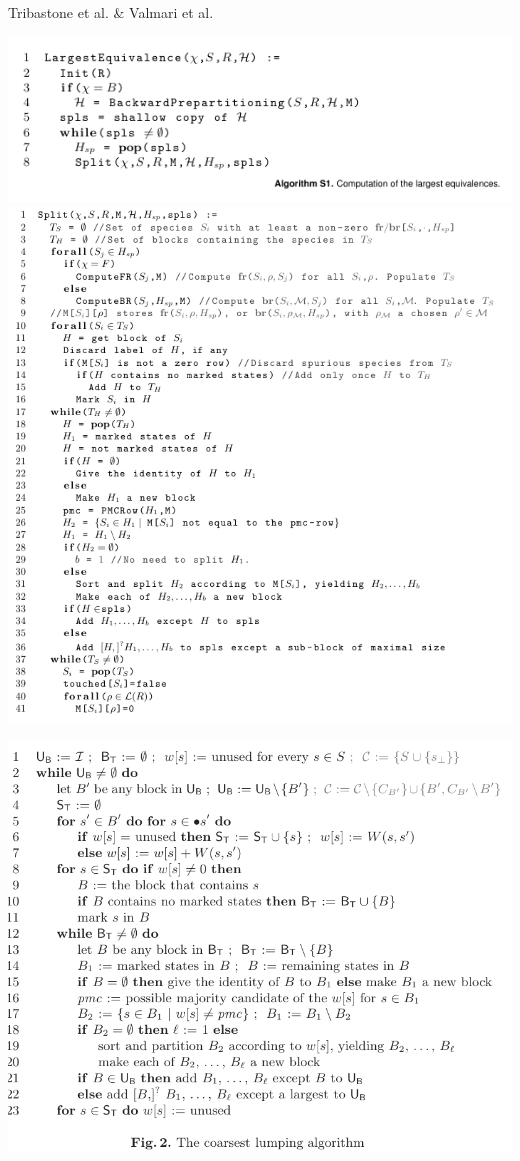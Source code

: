 \documentclass[rgb, pdf]{beamer}
\begin{document}
    \begin{frame}[allowframebreaks]{Tribastone et al. \& Valmari et al.}
    \begin{minipage}{0.45\textwidth}
     \includegraphics[height=0.2\textheight, width=\textwidth, keepaspectratio]{img/largest_equi.png}\\
     \includegraphics[height=0.78\textheight, width=\textwidth, keepaspectratio]{img/split.png}
    \end{minipage}
    \begin{minipage}{0.45\textwidth}
     \includegraphics[height=\textheight, width=\textwidth, keepaspectratio]{img/valmari.png}

\end{minipage}
\end{frame}
\end{document}
